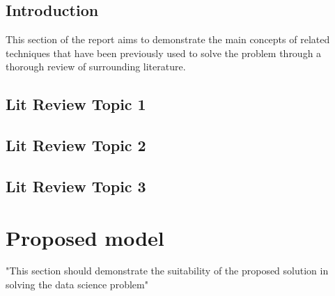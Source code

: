 \documentclass[12pt]{report}
\begin{document}

\section{Introduction}
This section of the report aims to demonstrate the main concepts
of related techniques that have been previously used to solve the problem 
through a thorough review of surrounding literature.



\section{Lit Review Topic 1}

\section{Lit Review Topic 2}

\section{Lit Review Topic 3}


\chapter{Proposed model}
"This section should demonstrate the suitability of
the proposed solution in solving the data science problem"





\printbibliography


\end{document}
